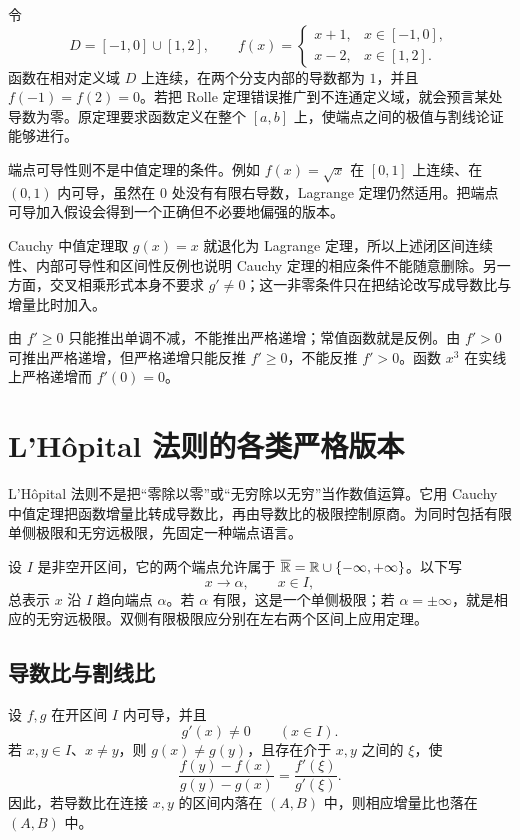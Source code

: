 \begin{counterexample}[定义域必须连接两端]
令
\[
 D=[-1,0]\cup[1,2],
\qquad
 f(x)=
 \begin{cases}
 x+1,&x\in[-1,0],\\
 x-2,&x\in[1,2].
 \end{cases}
\]
函数在相对定义域 \(D\) 上连续，在两个分支内部的导数都为 \(1\)，并且 \(f(-1)=f(2)=0\)。若把 Rolle 定理错误推广到不连通定义域，就会预言某处导数为零。原定理要求函数定义在整个 \([a,b]\) 上，使端点之间的极值与割线论证能够进行。
\end{counterexample}

端点可导性则不是中值定理的条件。例如 \(f(x)=\sqrt x\) 在 \([0,1]\) 上连续、在 \((0,1)\) 内可导，虽然在 \(0\) 处没有有限右导数，Lagrange 定理仍然适用。把端点可导加入假设会得到一个正确但不必要地偏强的版本。

Cauchy 中值定理取 \(g(x)=x\) 就退化为 Lagrange 定理，所以上述闭区间连续性、内部可导性和区间性反例也说明 Cauchy 定理的相应条件不能随意删除。另一方面，交叉相乘形式本身不要求 \(g'\ne0\)；这一非零条件只在把结论改写成导数比与增量比时加入。

\begin{remark}[严格符号与非严格单调性]
由 \(f'\ge0\) 只能推出单调不减，不能推出严格递增；常值函数就是反例。由 \(f'>0\) 可推出严格递增，但严格递增只能反推 \(f'\ge0\)，不能反推 \(f'>0\)。函数 \(x^3\) 在实线上严格递增而 \(f'(0)=0\)。
\end{remark}

\section{L'Hôpital 法则的各类严格版本}
\label{sec:lhopital-rules}

L'Hôpital 法则不是把“零除以零”或“无穷除以无穷”当作数值运算。它用 Cauchy 中值定理把函数增量比转成导数比，再由导数比的极限控制原商。为同时包括有限单侧极限和无穷远极限，先固定一种端点语言。

设 \(I\) 是非空开区间，它的两个端点允许属于
\(\overline{\mathbb{R}}=\mathbb{R}\cup\{-\infty,+\infty\}\)。以下写
\[
 x\to\alpha,\qquad x\in I,
\]
总表示 \(x\) 沿 \(I\) 趋向端点 \(\alpha\)。若 \(\alpha\) 有限，这是一个单侧极限；若 \(\alpha=\pm\infty\)，就是相应的无穷远极限。双侧有限极限应分别在左右两个区间上应用定理。

\subsection{导数比与割线比}

\begin{lemma}
\label{lem:cauchy-quotient-comparison}
设 \(f,g\) 在开区间 \(I\) 内可导，并且
\[
 g'(x)\ne0\qquad(x\in I).
\]
若 \(x,y\in I\)、\(x\ne y\)，则 \(g(x)\ne g(y)\)，且存在介于 \(x,y\) 之间的 \(\xi\)，使
\[
 \frac{f(y)-f(x)}{g(y)-g(x)}
 =\frac{f'(\xi)}{g'(\xi)}.
\]
因此，若导数比在连接 \(x,y\) 的区间内落在 \((A,B)\) 中，则相应增量比也落在 \((A,B)\) 中。
\end{lemma}

